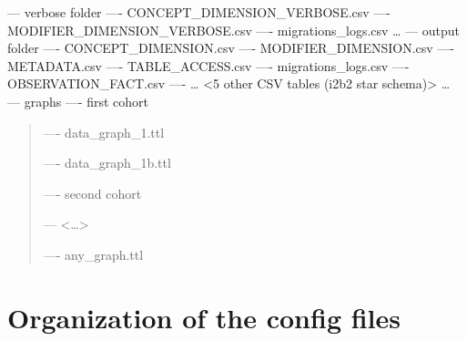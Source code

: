 \documentclass[letterpaper,10pt,english]{sphinxmanual}
\begin{document}
{\color{red}\bfseries{}\textbar{}}— verbose folder
\textbar{}           \textbar{}
\textbar{}            —- CONCEPT\_DIMENSION\_VERBOSE.csv
\textbar{}            —- MODIFIER\_DIMENSION\_VERBOSE.csv
\textbar{}            —- migrations\_logs.csv
…
\textbar{}
{\color{red}\bfseries{}\textbar{}}— output folder
\textbar{}           \textbar{}
\textbar{}            —- CONCEPT\_DIMENSION.csv
\textbar{}            —- MODIFIER\_DIMENSION.csv
\textbar{}            —- METADATA.csv
\textbar{}            —- TABLE\_ACCESS.csv
\textbar{}            —- migrations\_logs.csv
\textbar{}            —- OBSERVATION\_FACT.csv
\textbar{}            —- … \textless{}5 other CSV tables (i2b2 star schema)\textgreater{}
…
\textbar{}
{\color{red}\bfseries{}\textbar{}}—   graphs
\textbar{}           \textbar{}
\textbar{}            —- first cohort
\begin{quote}

\begin{DUlineblock}{0em}
\item[] {\color{red}\bfseries{}\textbar{}}
\item[] —- data\_graph\_1.ttl
\item[] —- data\_graph\_1b.ttl
\item[] —- second cohort
\item[] {\color{red}\bfseries{}\textbar{}}
\item[] — \textless{}…\textgreater{}
\item[] 
\item[] —- any\_graph.ttl
\end{DUlineblock}
\end{quote}


\section{Organization of the config files}
\label{\detokenize{configuration:organization-of-the-config-files}}\label{\detokenize{configuration:configuration}}\label{\detokenize{configuration::doc}}
\end{document}
